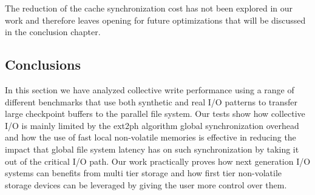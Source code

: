 The reduction of the cache synchronization cost has not been explored in our work and therefore leaves opening for future optimizations that will be discussed in the conclusion
chapter.

\subsection{Conclusions}
In this section we have analyzed collective write performance using a range of different benchmarks that use both synthetic and real I/O patterns to transfer large checkpoint buffers
to the parallel file system. Our tests show how collective I/O is mainly limited by the ext2ph algorithm global synchronization overhead and how the use of fast local non-volatile
memories is effective in reducing the impact that global file system latency has on such synchronization by taking it out of the critical I/O path. Our work practically proves
how next generation I/O systems can benefits from multi tier storage and how first tier non-volatile storage devices can be leveraged by giving the user more control over them.

